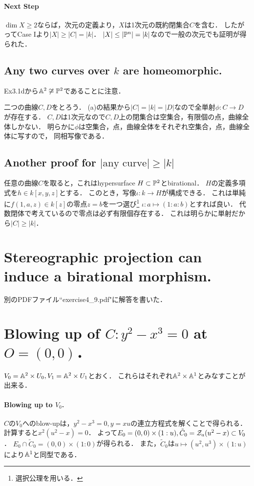 \documentclass[a4paper]{jsarticle}
\begin{document}
    \paragraph{Next Step}
    $\dim X \geq 2$ならば，次元の定義より，$X$は1次元の既約閉集合$C$を含む．
    したがってCase Iより$|X| \geq |C|=|k|$．
    $|X| \leq |\mathbb{P}^n|=|k|$なので一般の次元でも証明が得られた．

    \subsection{Any two curves over $k$ are homeomorphic.}
    Ex3.1dから$\mathbb{A}^2 \not \cong \mathbb{P}^2$であることに注意．

    二つの曲線$C,D$をとろう．
    (a)の結果から$|C|=|k|=|D|$なので全単射$\phi:C \to D$が存在する．
    $C,D$は1次元なので$C,D$上の閉集合は空集合，有限個の点，曲線全体しかない．
    明らかに$\phi$は空集合，点，曲線全体をそれぞれ空集合，点，曲線全体に写すので，
    同相写像である．

    \subsection{Another proof for $|\text{any curve}| \geq |k|$}
    任意の曲線$C$を取ると，これはhypersurface $H \subset \mathbb{P}^2$とbirational．
    $H$の定義多項式を$h \in k[x,y,z]$とする．
    このとき，写像$\iota: k \to H$が構成できる．
    これは単純に$f(1,a,z) \in k[z]$の零点$z=b$を一つ選び\footnote{選択公理を用いる．}
    $\iota: a \mapsto (1:a:b)$とすれば良い．
    代数閉体で考えているので零点は必ず有限個存在する．
    これは明らかに単射だから$|C| \geq |k|$．

\section{Stereographic projection can induce a birational morphism.} %
    別のPDFファイル``exercise4\_9.pdf"に解答を書いた．

\section{Blowing up of $C:y^2-x^3=0$ at $O=(0,0)$．} %
    $V_0=\mathbb{A}^2 \times U_0, V_1=\mathbb{A}^2 \times U_1$とおく．
    これらはそれぞれ$\mathbb{A}^2 \times \mathbb{A}^1$とみなすことが出来る．

    \paragraph{Blowing up to $V_0$.}
    $C$の$V_0$へのblow-upは，$y^2-x^3=0, y=xu$の連立方程式を解くことで得られる．
    計算すると$x^2(u^2-x)=0$．
    よって$E_0=(0,0) \times (1:u), \tilde{C}_0=\mathcal{Z}_a(u^2-x) \subset V_0$．
    $E_0 \cap \tilde{C}_0=(0,0) \times (1:0)$が得られる．
    また，$\tilde{C}_0$は$u \mapsto (u^2,u^3) \times (1:u)$により$\mathbb{A}^1$と同型である．
\end{document}
